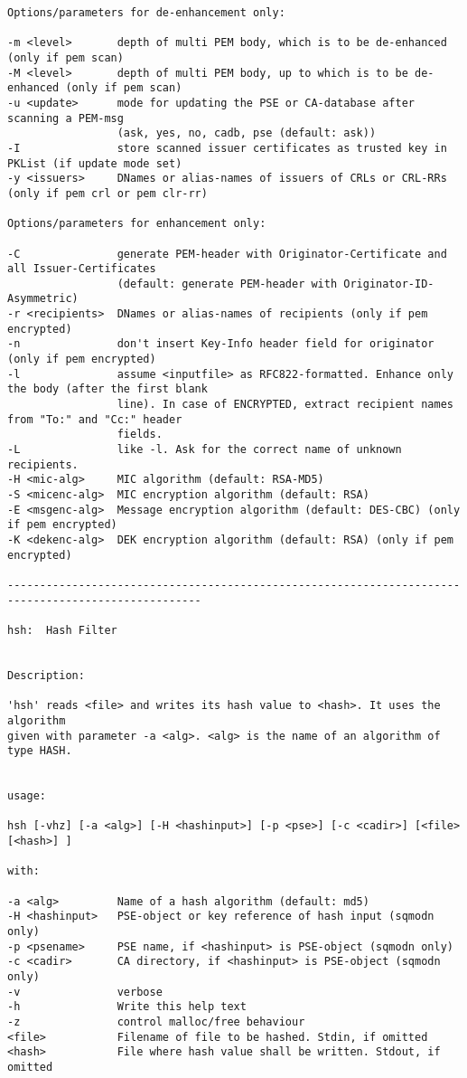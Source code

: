{\begin{verbatim}
Options/parameters for de-enhancement only:

-m <level>       depth of multi PEM body, which is to be de-enhanced (only if pem scan)
-M <level>       depth of multi PEM body, up to which is to be de-enhanced (only if pem scan)
-u <update>      mode for updating the PSE or CA-database after scanning a PEM-msg
                 (ask, yes, no, cadb, pse (default: ask))
-I               store scanned issuer certificates as trusted key in PKList (if update mode set)
-y <issuers>     DNames or alias-names of issuers of CRLs or CRL-RRs (only if pem crl or pem clr-rr)

Options/parameters for enhancement only:

-C               generate PEM-header with Originator-Certificate and all Issuer-Certificates
                 (default: generate PEM-header with Originator-ID-Asymmetric)
-r <recipients>  DNames or alias-names of recipients (only if pem encrypted)
-n               don't insert Key-Info header field for originator (only if pem encrypted)
-l               assume <inputfile> as RFC822-formatted. Enhance only the body (after the first blank
                 line). In case of ENCRYPTED, extract recipient names from "To:" and "Cc:" header 
                 fields.
-L               like -l. Ask for the correct name of unknown recipients.
-H <mic-alg>     MIC algorithm (default: RSA-MD5)
-S <micenc-alg>  MIC encryption algorithm (default: RSA)
-E <msgenc-alg>  Message encryption algorithm (default: DES-CBC) (only if pem encrypted)
-K <dekenc-alg>  DEK encryption algorithm (default: RSA) (only if pem encrypted)

----------------------------------------------------------------------------------------------------

hsh:  Hash Filter


Description:

'hsh' reads <file> and writes its hash value to <hash>. It uses the algorithm
given with parameter -a <alg>. <alg> is the name of an algorithm of type HASH.


usage:

hsh [-vhz] [-a <alg>] [-H <hashinput>] [-p <pse>] [-c <cadir>] [<file> [<hash>] ]

with:

-a <alg>         Name of a hash algorithm (default: md5)
-H <hashinput>   PSE-object or key reference of hash input (sqmodn only)
-p <psename>     PSE name, if <hashinput> is PSE-object (sqmodn only)
-c <cadir>       CA directory, if <hashinput> is PSE-object (sqmodn only)
-v               verbose
-h               Write this help text
-z               control malloc/free behaviour
<file>           Filename of file to be hashed. Stdin, if omitted
<hash>           File where hash value shall be written. Stdout, if omitted


\end{verbatim}}
